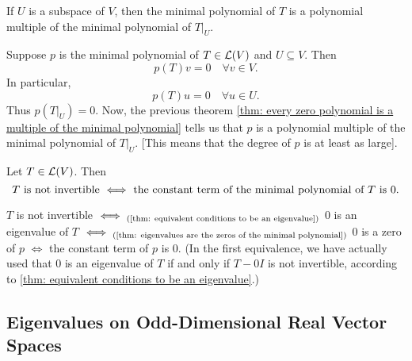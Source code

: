 \setcounter{thm}{30}
\begin{thm}
  \label{thm: minimal polynomial of a restriction operator}
  If $U$ is a subspace of $V$, then the minimal polynomial of $T$ is a polynomial multiple of the minimal polynomial of $\left .T \right | _{ U}$.
\end{thm}
\begin{prf}
  Suppose $p$ is the minimal polynomial of $T\in \mathcal{L}(V)$ and $U \subseteq V$. Then
  \begin{equation}
    p(T)v=0 \quad \forall v \in V.
  \end{equation}
  In particular,
  \begin{equation}
    p(T)u=0 \quad \forall u\in U.
  \end{equation} Thus $p\left( \left.T\right|_{U} \right)=0.$ Now, the previous theorem
  \ref{thm: every zero polynomial is a multiple of the minimal polynomial} tells us that $p$ is a polynomial multiple of the minimal polynomial of $\left. T \right |_U$. [This means that the degree of $p$ is at least as large].
\end{prf}

\begin{thm} 
  Let $T \in \mathcal{L} (V)$. Then
  \begin{equation}
    T$ is not invertible $\iff$ the constant term of the minimal polynomial of $T$ is $0.
  \end{equation}
\end{thm}
\begin{prf}
  $T$ is not invertible $\iff_{\text{(\ref{thm: equivalent conditions to be an eigenvalue})}}$ $0$ is an eigenvalue of $T$ $\iff_{(\text{\ref{thm: eigenvalues are the zeros of the minimal polynomial})}}$ $0$ is a zero of $p$ $\iff$ the constant term of $p$ is $0$.
  (In the first equivalence, we have actually used that $0$ is an eigenvalue of $T$ if and only if $T-0I$ is not invertible, according to \ref{thm: equivalent conditions to be an eigenvalue}.)
\end{prf}

\subsection{Eigenvalues on Odd-Dimensional Real Vector Spaces}

